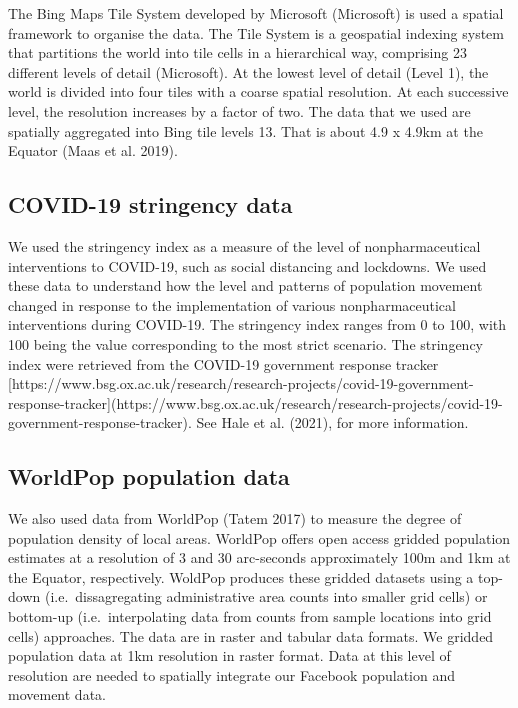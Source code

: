 \documentclass[
  11pt,
]{article}
\begin{document}
The Bing Maps Tile System developed by Microsoft (Microsoft) is used a
spatial framework to organise the data. The Tile System is a geospatial
indexing system that partitions the world into tile cells in a
hierarchical way, comprising 23 different levels of detail (Microsoft).
At the lowest level of detail (Level 1), the world is divided into four
tiles with a coarse spatial resolution. At each successive level, the
resolution increases by a factor of two. The data that we used are
spatially aggregated into Bing tile levels 13. That is about 4.9 x 4.9km
at the Equator (Maas et al. 2019).

\hypertarget{covid-19-stringency-data}{%
\subsection{COVID-19 stringency data}\label{covid-19-stringency-data}}

We used the stringency index as a measure of the level of
nonpharmaceutical interventions to COVID-19, such as social distancing
and lockdowns. We used these data to understand how the level and
patterns of population movement changed in response to the
implementation of various nonpharmaceutical interventions during
COVID-19. The stringency index ranges from 0 to 100, with 100 being the
value corresponding to the most strict scenario. The stringency index
were retrieved from the COVID-19 government response tracker
{[}https://www.bsg.ox.ac.uk/research/research-projects/covid-19-government-response-tracker{]}(https://www.bsg.ox.ac.uk/research/research-projects/covid-19-government-response-tracker).
See Hale et al. (2021), for more information.

\hypertarget{worldpop-population-data}{%
\subsection{WorldPop population data}\label{worldpop-population-data}}

We also used data from WorldPop (Tatem 2017) to measure the degree of
population density of local areas. WorldPop offers open access gridded
population estimates at a resolution of 3 and 30 arc-seconds
approximately 100m and 1km at the Equator, respectively. WoldPop
produces these gridded datasets using a top-down (i.e.~dissagregating
administrative area counts into smaller grid cells) or bottom-up
(i.e.~interpolating data from counts from sample locations into grid
cells) approaches. The data are in raster and tabular data formats. We
gridded population data at 1km resolution in raster format. Data at this
level of resolution are needed to spatially integrate our Facebook
population and movement data.
\end{document}
